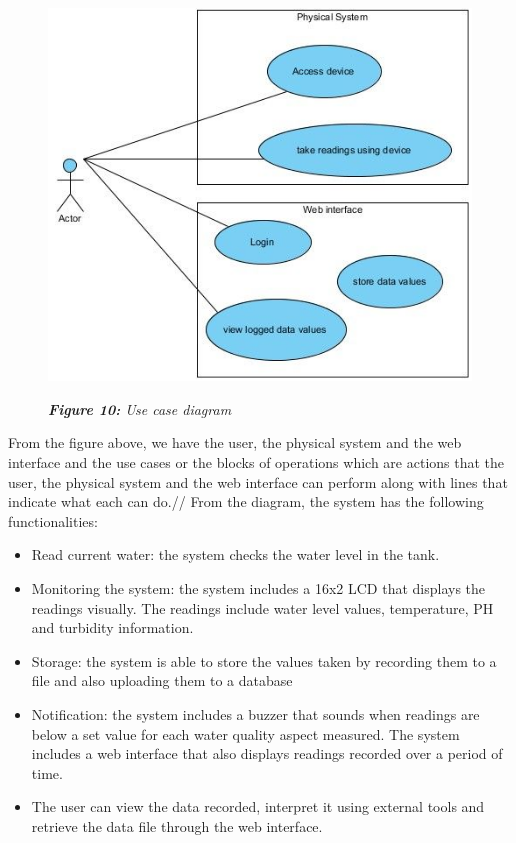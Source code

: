 \documentclass[12pt]{article}
\begin{document}
\newpage
\begin{figure}
\includegraphics[scale=0.4]{Use Case Diagram.jpg}   %
\begin{center}
\textit{\textbf{Figure 10:} Use case diagram}  %
\end{center}
\end{figure} 
From the figure above, we have the user, the physical system and the web interface and the use cases or the blocks of operations which are actions that the user, the physical system and the web interface can perform along with lines that indicate what each can do.//
From the diagram, the system has the following functionalities:
\begin{itemize}
\item  	Read current water: the system checks the water level in the tank.
\item	Monitoring the system: the system includes a 16x2 LCD that displays the readings visually. The readings include water level values, temperature, PH and turbidity information.
\item	Storage: the system is able to store the values taken by recording them to a file and also uploading them to a database 
\item	Notification: the system includes a buzzer that sounds when readings are below a set value for each water quality aspect measured. The system includes a web interface that also displays readings recorded over a period of time.
\item	The user can view the data recorded, interpret it using external tools and retrieve the data file through the web interface.

\end{itemize}
\end{document}
